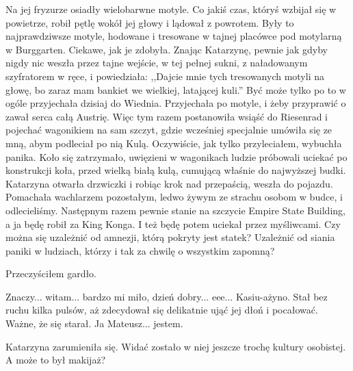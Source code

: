 Na jej fryzurze osiadły wielobarwne motyle. Co jakiś czas, któryś wzbijał się w powietrze, robił pętlę wokół jej głowy i lądował z powrotem.
Były to najprawdziwsze motyle, hodowane i tresowane w tajnej placówce pod motylarną w Burggarten.
Ciekawe, jak je zdobyła. Znając Katarzynę, pewnie jak gdyby nigdy nic weszła przez tajne wejście, w tej pełnej sukni, z naładowanym szyfratorem w ręce, i powiedziała:
,,Dajcie mnie tych tresowanych motyli na głowę, bo zaraz mam bankiet we wielkiej, latającej kuli.''
Być może tylko po to w ogóle przyjechała dzisiaj do Wiednia.
Przyjechała po motyle, i żeby przyprawić o zawał serca całą Austrię.
Więc tym razem postanowiła wsiąść do Riesenrad i pojechać wagonikiem na sam szczyt, gdzie wcześniej specjalnie umówiła się ze mną, abym podleciał po nią Kulą.
Oczywiście, jak tylko przyleciałem, wybuchła panika. Koło się zatrzymało, uwięzieni w wagonikach ludzie próbowali uciekać po konstrukcji koła, 
przed wielką białą kulą, cumującą właśnie do najwyższej budki. Katarzyna otwarła drzwiczki i robiąc krok nad przepaścią, weszła do pojazdu.
Pomachała wachlarzem pozostałym, ledwo żywym ze strachu osobom w budce, i odlecieliśmy.
Następnym razem pewnie stanie na szczycie Empire State Building, a ja będę robił za King Konga.
I też będę potem uciekał przez myśliwcami.
Czy można się uzależnić od amnezji, którą pokryty jest statek?
Uzależnić od siania paniki w ludziach, którzy i tak za chwilę o wszystkim zapomną?

Przeczyściłem gardło.
\begin{dialogue}
\ds{} Znaczy... witam... bardzo mi miło, dzień dobry... eee... Kasiu-ażyno. \dm{} Stał bez ruchu kilka pulsów, aż zdecydował się delikatnie ująć jej dłoń i pocałować.
Ważne, że się starał. \dm{} Ja Mateusz... jestem.
\end{dialogue}

Katarzyna zarumieniła się. Widać zostało w niej jeszcze trochę kultury osobistej. A może to był makijaż?

